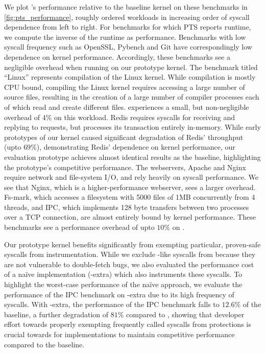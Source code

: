 \documentclass[letterpaper,twocolumn,10pt, anonymous]{article}
\begin{document}
We plot \tiktok's performance relative to the baseline kernel on
these benchmarks in \autoref{fig:pts_performance}, roughly ordered 
workloads in increasing order of syscall dependence from left to right.
For benchmarks for which PTS reports runtime, we compute the inverse 
of the runtime as performance.
Benchmarks with low syscall frequency such as OpenSSL, 
Pybench and Git have correspondingly low dependence on kernel performance.
Accordingly, these benchmarks see a negligible overhead when running 
on our prototype kernel.
The benchmark titled ``Linux'' represents compilation of the Linux kernel.
While compilation is mostly CPU bound, compiling the Linux kernel requires 
accessing a large number of source files, resulting in the creation 
of a large number of compiler processes each of which read and create 
different files. 
\tiktok experiences a small, but non-negligible overhead of $4\%$ on this workload.
Redis requires syscalls for receiving and replying to requests, but 
processes its transaction entirely in-memory. 
While early prototypes of our kernel caused significant degradation
of Redis' throughput (upto $69\%$), demonstrating Redis' dependence 
on kernel performance, 
our evaluation prototype achieves almost identical results as the baseline, 
highlighting the prototype's competitive performance.
The webservers, Apache and Nginx require network and file-system I/O, 
and rely heavily on syscall performance. 
We see that Nginx, which is a higher-performance webserver, sees a larger
overhead.
Fs-mark, which accesses a filesystem with 5000 files of 1MB concurrently
from 4 threads, and IPC, which implements 128 byte transfers between 
two processes over a TCP connection, are almost entirely bound by kernel 
performance. 
These benchmarks see a performance overhead of upto $10\%$ on \tiktok.

Our prototype \tiktok kernel benefits significantly from 
exempting particular, proven-safe syscalls from instrumentation.
While we exclude -like syscalls from \tiktok because they 
are not vulnerable to double-fetch bugs, we also evaluated the
performance cost of a na\"ive implementation (\tiktok-extra)
which also instruments these syscalls.
To highlight the worst-case performance of the na\"ive approach, we 
evaluate the performance of the IPC benchmark on \tiktok-extra due 
to its high frequency of  syscalls.
With \tiktok-extra, the performance of the IPC benchmark falls to 
$12.6\%$ of the baseline, a further degradation of $81\%$ compared 
to \tiktok, showing that developer effort towards properly exempting 
frequently called syscalls from \tiktok protections is crucial
towards for implementations to maintain competitive performance
compared to the baseline.
\end{document}
